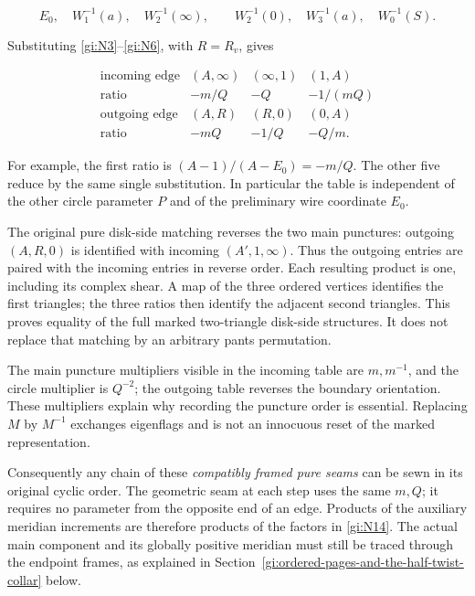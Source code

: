 \begin{equation}\label{gi:N17}
E_0,\quad W_1^{-1}(a),\quad W_2^{-1}(\infty),\qquad
 W_2^{-1}(0),\quad W_3^{-1}(a),\quad W_0^{-1}(S).
\end{equation}

Substituting \eqref{gi:N3}--\eqref{gi:N6}, with \(R=R_v\), gives

\begin{equation}\label{gi:N18}
\begin{array}{c|ccc}
 \text{incoming edge}&(A,\infty)&(\infty,1)&(1,A)\\ \hline
 \text{ratio}&-m/Q&-Q&-1/(mQ)\\
 \text{outgoing edge}&(A,R)&(R,0)&(0,A)\\ \hline
 \text{ratio}&-mQ&-1/Q&-Q/m .
\end{array}
\end{equation}

For example, the first ratio is \((A-1)/(A-E_0)=-m/Q\).
The other five reduce by the same single substitution. In particular
the table is independent of the other circle parameter \(P\) and
of the preliminary wire coordinate \(E_0\).

The original pure disk-side matching reverses the two main
punctures: outgoing \((A,R,0)\) is identified with incoming
\((A',1,\infty)\). Thus the outgoing entries are paired with
the incoming entries in reverse order. Each resulting product is
one, including its complex shear. A map of the three ordered
vertices identifies the first triangles; the three ratios then
identify the adjacent second triangles. This proves equality of
the full marked two-triangle disk-side structures. It does not
replace that matching by an arbitrary pants permutation.

The main puncture multipliers visible in the incoming table are
\(m,m^{-1}\), and the circle multiplier is \(Q^{-2}\);
the outgoing table reverses the boundary orientation. These
multipliers explain why recording the puncture order is essential.
Replacing \(M\) by \(M^{-1}\) exchanges eigenflags and is not
an innocuous reset of the marked representation.

Consequently any chain of these \emph{compatibly framed pure seams}
can be sewn in its original cyclic order. The geometric seam at
each step uses the same \(m,Q\); it requires no parameter from
the opposite end of an edge. Products of the auxiliary meridian
increments are therefore products of the factors in \eqref{gi:N14}.
The actual main component and its globally positive meridian
must still be traced through the endpoint frames, as explained
in Section~\ref{gi:ordered-pages-and-the-half-twist-collar} below.

